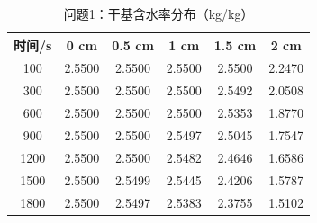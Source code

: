 \begin{table}[H]\centering
\caption{问题1：干基含水率分布（kg/kg）}\label{tab:q1C}
\begin{tabular}{cccccc}\toprule
时间/s & 0 cm & 0.5 cm & 1 cm & 1.5 cm & 2 cm\\ \midrule
100 & 2.5500 & 2.5500 & 2.5500 & 2.5500 & 2.2470\\
300 & 2.5500 & 2.5500 & 2.5500 & 2.5492 & 2.0508\\
600 & 2.5500 & 2.5500 & 2.5500 & 2.5353 & 1.8770\\
900 & 2.5500 & 2.5500 & 2.5497 & 2.5045 & 1.7547\\
1200 & 2.5500 & 2.5500 & 2.5482 & 2.4646 & 1.6586\\
1500 & 2.5500 & 2.5499 & 2.5445 & 2.4206 & 1.5787\\
1800 & 2.5500 & 2.5497 & 2.5383 & 2.3755 & 1.5102\\
\bottomrule\end{tabular}\end{table}
